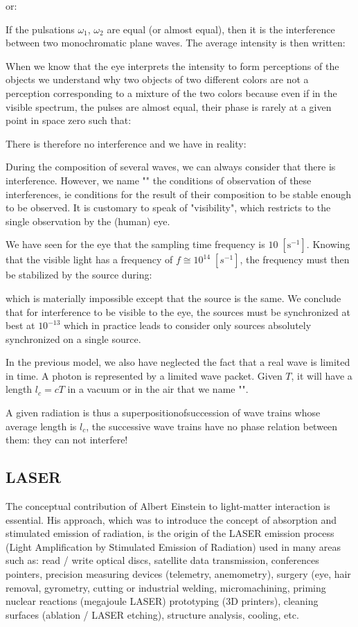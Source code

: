 	or:
	
	If the pulsations $\omega_1$, $\omega_2$ are equal (or almost equal), then it is the interference between two monochromatic plane waves. The average intensity is then written:
	
	When we know that the eye interprets the intensity to form perceptions of the objects we understand why two objects of two different colors are not a perception corresponding to a mixture of the two colors because even if in the visible spectrum, the pulses are almost equal, their phase is rarely at a given point in space zero such that:
	
	There is therefore no interference and we have in reality:
	
	\begin{tcolorbox}[title=Remark,colframe=black,arc=10pt]
	During the composition of several waves, we can always consider that there is interference. However, we name "" the conditions of observation of these interferences, ie conditions for the result of their composition to be stable enough to be observed. It is customary to speak of "visibility", which restricts to the single observation by the (human) eye.
	\end{tcolorbox}
	We have seen for the eye that the sampling time frequency is $10\;[\text{s}^{-1}]$. Knowing that the visible light has a frequency of $f\cong 10^{14}\;[s^{-1}]$, the frequency must then be stabilized by the source during:
	
	which is materially impossible except that the source is the same. We conclude that for interference to be visible to the eye, the sources must be synchronized at best at $10^{-13}$ which in practice leads to consider only sources absolutely synchronized on a single source.

	In the previous model, we also have neglected the fact that a real wave is limited in time. A photon is represented by a limited wave packet. Given $T$, it will have a length $l_c=cT$ in a vacuum or in the air that we name "".

	A given radiation is thus a superpositionofsuccession of wave trains whose average length is $l_c$, the successive wave trains have no phase relation between them: they can not interfere!
	
	\pagebreak
	\subsection{LASER}
	The conceptual contribution of Albert Einstein to light-matter interaction is essential. His approach, which was to introduce the concept of absorption and stimulated emission of radiation, is the origin of the LASER emission process (Light Amplification by Stimulated Emission of Radiation) used in many areas such as: read / write optical discs, satellite data transmission, conferences pointers, precision measuring devices (telemetry, anemometry), surgery (eye, hair removal, gyrometry, cutting or industrial welding, micromachining, priming nuclear reactions (megajoule  LASER) prototyping (3D printers), cleaning surfaces (ablation / LASER etching), structure analysis, cooling, etc.

